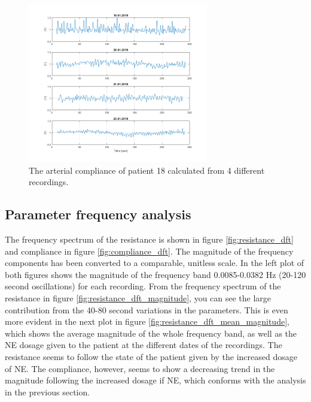 \begin{figure}[h!]
    \centering
    \includegraphics[width=0.7\textwidth]{fig/results/compliance_patient18_rel.png}
    \caption{The arterial compliance of patient 18 calculated from 4 different recordings.}
    \label{fig:compliance_patient18}
\end{figure}{}

\newpage

\subsection{Parameter frequency analysis}

The frequency spectrum of the resistance is shown in figure \ref{fig:resistance_dft} and compliance in figure \ref{fig:compliance_dft}. The magnitude of the frequency components has been converted to a comparable, unitless scale. In the left plot of both figures shows the magnitude of the frequency band 0.0085-0.0382 Hz (20-120 second oscillations) for each recording. From the frequency spectrum of the resistance in figure \ref{fig:resistance_dft_magnitude}, you can see the large contribution from the 40-80 second variations in the parameters. This is even more evident in the next plot in figure \ref{fig:resistance_dft_mean_magnitude}, which shows the average magnitude of the whole frequency band, as well as the NE dosage given to the patient at the different dates of the recordings. The resistance seems to follow the state of the patient given by the increased dosage of NE. The compliance, however, seems to show a decreasing trend in the magnitude following the increased dosage if NE, which conforms with the analysis in the previous section.

